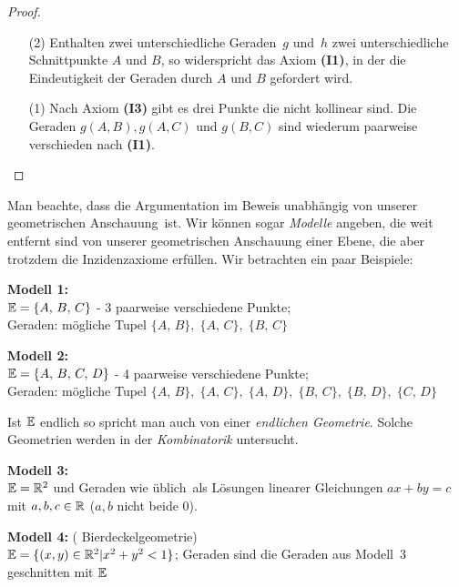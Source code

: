 \begin{proof}
\begin{enumerate}
\item[(2)]
Enthalten zwei unterschiedliche Geraden~$g$ und~$h$ 
zwei unterschiedliche Schnittpunkte $A$ und $B$, so widerspricht das
Axiom {\bf(I1)}, in der die Eindeutigkeit der Geraden durch $A$ und
$B$ gefordert wird.

\item[(1)] Nach Axiom {\bf(I3)} gibt es drei Punkte die nicht kollinear
  sind. Die Geraden $g(A,B), g(A,C)$ und $g(B,C)$ 
sind wiederum paarweise verschieden nach {\bf(I1)}.

\end{enumerate}
\end{proof}


Man beachte, dass die Argumentation im Beweis unabhängig von unserer \glqq
geometrischen Anschauung\grqq\ ist. Wir können sogar {\em Modelle} angeben,
die weit entfernt sind von unserer geometrischen Anschauung einer Ebene,
die aber trotzdem die Inzidenzaxiome erfüllen. Wir betrachten ein paar Beispiele:


{\bf Modell 1:}\\ $\mathbb E=\{A,\,B,\,C\}$ - 3 paarweise
verschiedene Punkte;\\
Geraden: mögliche Tupel $\{A,\,B\},\;\{A,\,C\},\;\{B,\,C\}$

{\bf Modell 2:}\\
$\mathbb E=\{A,\,B,\,C,\,D\}$ - 4 paarweise verschiedene Punkte;\\
Geraden: mögliche Tupel $\{A,\,B\},\;\{A,\,C\},\;\{A,\,D\},\;\{B,\,C\},\;\{B,\,D\},\;\{C,\,D\}$

Ist $\mathbb E$ endlich so spricht man auch von einer {\em endlichen Geometrie}.
Solche Geometrien werden in der {\em Kombinatorik} untersucht.


{\bf Modell 3:}\\$\mathbb E=\mathbb R^2$ und Geraden \glqq wie üblich\grqq\ als
Lösungen linearer Gleichungen $a x + b y = c$ mit $a,b,c\in \mathbb R$ ($a,b$
nicht beide $0$).

{\bf Modell 4:} ( \glqq Bierdeckelgeometrie\grqq )\\ %
$\mathbb E=\{ (x,y)\in\mathbb R^2 | x^2+y^2<1 \}$;
Geraden sind die Geraden aus Modell~3 geschnitten mit $\mathbb E$



